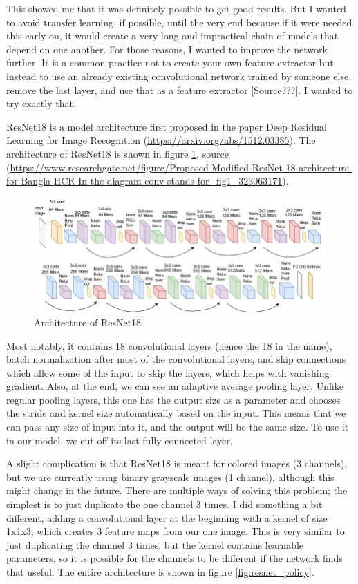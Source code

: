 \documentclass[
  digital,     %
  oneside,     %
  nosansbold,  %
  nocolorbold, %
  lof,         %
  lot,         %
]{fithesis4}
\begin{document}
This showed me that it was definitely possible to get good results. But I wanted to avoid transfer learning, if possible, until the very end because if it were needed this early on, it would create a very long and impractical chain of models that depend on one another. For those reasons, I wanted to improve the network further. It is a common practice not to create your own feature extractor but instead to use an already existing convolutional network trained by someone else, remove the last layer, and use that as a feature extractor [Source???]. I wanted to try exactly that.

ResNet18 is a model architecture first proposed in the paper Deep Residual Learning for Image Recognition (\url{https://arxiv.org/abs/1512.03385}). The architecture of ResNet18 is shown in figure \ref{fig:resnet}, source (\url{https://www.researchgate.net/figure/Proposed-Modified-ResNet-18-architecture-for-Bangla-HCR-In-the-diagram-conv-stands-for_fig1_323063171}).

\begin{figure}
    \centering
    \includegraphics[width=1\linewidth]{diagrams/resnet.png}
    \caption{Architecture of ResNet18}
    \label{fig:resnet}
\end{figure}

Most notably, it contains 18 convolutional layers (hence the 18 in the name), batch normalization after most of the convolutional layers, and skip connections which allow some of the input to skip the layers, which helps with vanishing gradient. Also, at the end, we can see an adaptive average pooling layer. Unlike regular pooling layers, this one has the output size as a parameter and chooses the stride and kernel size automatically based on the input. This means that we can pass any size of input into it, and the output will be the same size. To use it in our model, we cut off its last fully connected layer.

A slight complication is that ResNet18 is meant for colored images (3 channels), but we are currently using binary grayscale images (1 channel), although this might change in the future. There are multiple ways of solving this problem; the simplest is to just duplicate the one channel 3 times. I did something a bit different, adding a convolutional layer at the beginning with a kernel of size 1x1x3, which creates 3 feature maps from our one image. This is very similar to just duplicating the channel 3 times, but the kernel contains learnable parameters, so it is possible for the channels to be different if the network finds that useful. The entire architecture is shown in figure \ref{fig:resnet_policy}.
\end{document}
